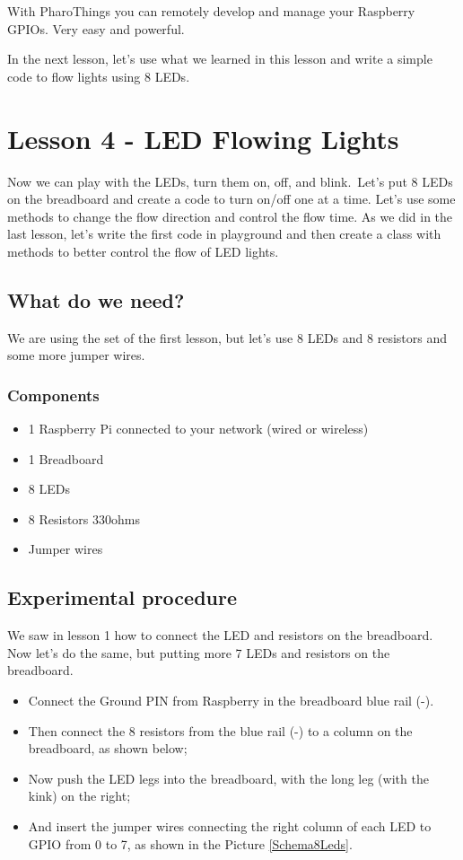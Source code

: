 \documentclass[10pt,twoside,english]{_support/latex/sbabook/sbabook}
\begin{document}
With PharoThings you can remotely develop and manage your Raspberry GPIOs. Very easy and powerful.

In the next lesson, let’s use what we learned in this lesson and write a simple code to flow lights using 8 LEDs.

\chapter{Lesson 4 - LED Flowing Lights}
Now we can play with the LEDs, turn them on, off, and blink. Let's put 8 LEDs on the breadboard and create a code to turn on/off one at a time. Let's use some methods to change the flow direction and control the flow time. As we did in the last lesson, let's write the first code in playground and then create a class with methods to better control the flow of LED lights. 
\section{What do we need?}
We are using the set of the first lesson, but let's use 8 LEDs and 8 resistors and some more jumper wires.
\subsection{Components}
\begin{itemize}
\item 1 Raspberry Pi connected to your network (wired or wireless)
\item 1 Breadboard
\item 8 LEDs
\item 8 Resistors 330ohms
\item Jumper wires
\end{itemize}
\section{Experimental procedure}
We saw in lesson 1 how to connect the LED and resistors on the breadboard. Now let's do the same, but putting more 7 LEDs and resistors on the breadboard. 

\begin{itemize}
\item Connect the Ground PIN from Raspberry in the breadboard blue rail (-). 
\item Then connect the 8 resistors from the blue rail (-) to a column on the breadboard, as shown below;
\item Now push the LED legs into the breadboard, with the long leg (with the kink) on the right;
\item And insert the jumper wires connecting the right column of each LED to GPIO from 0 to 7, as shown in the Picture \ref{Schema8Leds}.
\end{itemize}
\end{document}
